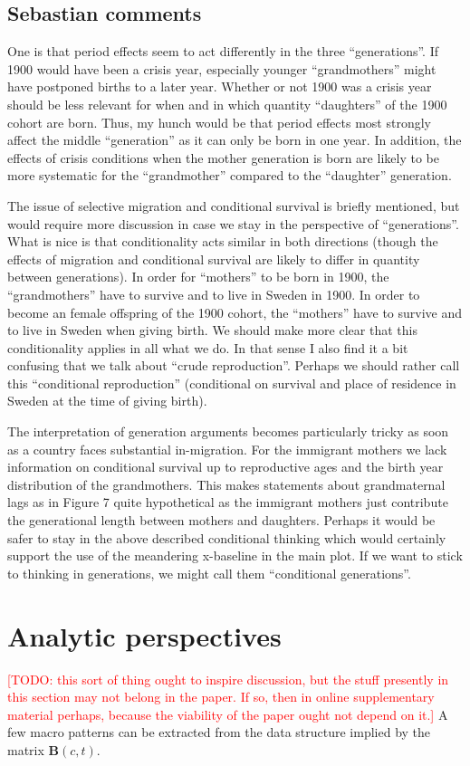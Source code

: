 \documentclass{article}
\newcommand\todo[1]{\textcolor{red}{[TODO: #1]}}
\begin{document}
\subsection{Sebastian comments}
One is that period effects seem to act differently in the three “generations”. If 1900 would have been a crisis year, especially younger “grandmothers” might have postponed births to a later year. Whether or not 1900 was a crisis year should be less relevant for when and in which quantity “daughters” of the 1900 cohort are born. Thus, my hunch would be that period effects most strongly affect the middle “generation” as it can only be born in one year. In addition, the effects of crisis conditions when the mother generation is born are likely to be more systematic for the “grandmother” compared to the “daughter” generation.

The issue of selective migration and conditional survival is briefly mentioned, but would require more discussion in case we stay in the perspective of “generations”. What is nice is that conditionality acts similar in both directions (though the effects of migration and conditional survival are likely to differ in quantity between generations). In order for “mothers” to be born in 1900, the “grandmothers” have to survive and to live in Sweden in 1900. In order to become an female offspring of the 1900 cohort, the “mothers” have to survive and to live in Sweden when giving birth. We should make more clear that this conditionality applies in all what we do. In that sense I also find it a bit confusing that we talk about “crude reproduction”. Perhaps we should rather call this “conditional reproduction” (conditional on survival and place of residence in Sweden at the time of giving birth).

The interpretation of generation arguments becomes particularly tricky as soon as a country faces substantial in-migration. For the immigrant mothers we lack information on conditional survival up to reproductive ages and the birth year distribution of the grandmothers. This makes statements about grandmaternal lags as in Figure 7 quite hypothetical as the immigrant mothers just contribute the generational length between mothers and daughters. Perhaps it would be safer to stay in the above described conditional thinking which would certainly support the use of the meandering x-baseline in the main plot. If we want to stick to thinking in generations, we might call them “conditional generations”.

\section{Analytic perspectives}
\todo{this sort of thing ought to inspire discussion, but the stuff presently in this section may not belong in the paper. If so, then in online supplementary material perhaps, because the viability of the paper ought not depend on it.}
A few macro patterns can be extracted from the data structure implied by the matrix $\mathbf{B}(c,t)$. 
\end{document}
